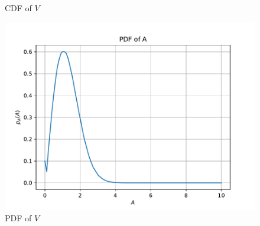 \documentclass[12pt]{book}
\begin{document}
\begin{enumerate}
\begin{figure}[H]
\caption{CDF of $V$}
\label{fig:sqrt_cdf}
\end{figure}
\begin{figure}[H]
\centering
\includegraphics[width=\columnwidth]{./figs/4/4.1.3p.pdf}
\caption{PDF of $V$}
\label{fig:sqrt_pdf}
\end{figure}
\end{enumerate}
\end{document}
